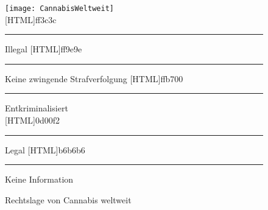 \documentclass[../main.tex]{subfiles}
\begin{document}
	 \noindent
	 \begin{figure}[H]
	 	\centering
	 	\texttt{[image: CannabisWeltweit]}\\[7pt]
	 	
		{ff3c3c}{\rule{0pt}{6pt}\rule{6pt}{0pt}}\hspace{0.8em} Illegal \hspace{2.5em}
	 	[HTML]{ff9e9e}{\rule{0pt}{6pt}\rule{6pt}{0pt}}\hspace{0.8em} Keine zwingende Strafverfolgung \hspace{2.5em}
	 	[HTML]{ffb700}{\rule{0pt}{6pt}\rule{6pt}{0pt}}\hspace{0.8em} Entkriminalisiert\\[5pt]
	 	[HTML]{0d00f2}{\rule{0pt}{6pt}\rule{6pt}{0pt}}\hspace{0.8em} Legal \hspace{2.5em}
	 	[HTML]{b6b6b6}{\rule{0pt}{6pt}\rule{6pt}{0pt}}\hspace{0.8em} Keine Information	 	
	 	
	 	\captionsetup{font=small}
	 	\caption[Rechtslage von Cannabis weltweit]{Rechtslage von Cannabis weltweit\protect\footnotemark}
	 	\label{fig:worldwide}
	 \end{figure}
	 
	 \noindent
	 
	 
	 
\end{document}
